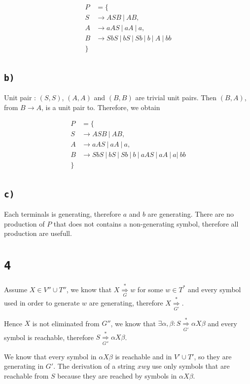 \documentclass[a4paper,11pt]{report}
\begin{document}
\begin{align*}
  P &= \{\\
  S &\to ASB\ |\ AB ,\\
  A &\to aAS\ |\ aA\ |\ a ,\\
  B &\to SbS\ |\ bS\ |\ Sb\ |\ b\ |\ A\ |\ bb\\
  \}\\
\end{align*}

\subsection*{\texttt{b)}}

Unit pair : $(S,S)$, $(A,A)$ and $(B,B)$ are trivial unit pairs. Then $(B,A)$,
from $B \to A$, is a unit pair to. Therefore, we obtain

\begin{align*}
  P &= \{\\
  S &\to ASB\ |\ AB ,\\
  A &\to aAS\ |\ aA\ |\ a ,\\
  B &\to SbS\ |\ bS\ |\ Sb\ |\ b\ |\ aAS\ |\ aA\ |\ a |\ bb\\
  \}\\
\end{align*}

\subsection*{\texttt{c)}}

Each terminals is generating, therefore $a$ and $b$ are generating. There are no
production of $P$ that does not contains a non-generating symbol, therefore all
production are usefull.

\section*{\texttt{4}}

Assume $X \in V'' \cup T''$, we know that $X
\overset{*}{\underset{G}{\Rightarrow}} w$ for some $w \in T^*$ and every symbol
used in order to generate $w$ are generating, therefore $X
\overset{*}{\underset{G'}{\Rightarrow}}$.

Hence $X$ is not eliminated from $G''$, we know that $ \exists \alpha,\beta : S
\overset{*}{\underset{G'}{\Rightarrow}} \alpha X \beta$ and every symbol is
reachable, therefore $S \overset{*}{\underset{G''}{\Rightarrow}} \alpha X \beta$.

We know that every symbol in $\alpha X \beta$ is reachable and in $V' \cup
T'$, so they are generating in $G'$. The derivation of a string $xwy$ use only
symbols that are reachable from $S$ because they are reached by symbols in
$\alpha X \beta$.
\end{document}
